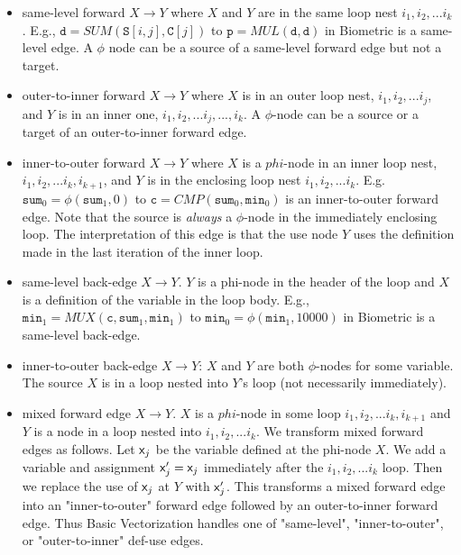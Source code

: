 \documentclass[sigconf, screen, natbib=false, dvipsnames, table]{acmart}
\theoremstyle{definition}
\begin{document}
\begin{itemize}
\item same-level forward $X\rightarrow Y$ where $X$ and $Y$ are in the same loop nest $i_1,i_2,...i_k$. E.g., $\texttt{d} = \mathit{SUM}(\texttt{S}[i,j], \texttt{C}[j])$ to $\texttt{p} = \mathit{MUL}(\texttt{d},\texttt{d})$ in Biometric is a same-level edge. A $\phi$ node can be a source of a same-level forward edge but not a target.
\item outer-to-inner forward $X\rightarrow Y$ where $X$ is in an outer loop nest, $i_1,i_2,...i_j$, and $Y$ is in an inner one, $i_1,i_2,...i_j,...,i_k$. A $\phi$-node can be a source or a target of an outer-to-inner forward edge.
\item inner-to-outer forward $X\rightarrow Y$ where $X$ is a $phi$-node in an inner loop nest, $i_1,i_2,...i_k,i_{k+1}$, and $Y$ is in the enclosing loop nest $i_1,i_2,...i_k$. E.g. $\texttt{sum}_0 = \phi(\texttt{sum}_1, 0)$ to $\texttt{c} = \mathit{CMP}(\texttt{sum}_0,\texttt{min}_0)$ is an inner-to-outer forward edge. Note that the source is \emph{always} a $\phi$-node in the immediately enclosing loop. The interpretation of this edge is that the use node $Y$ uses the definition made in the last iteration of the inner loop.
\item same-level back-edge $X\rightarrow Y$. $Y$ is a phi-node in the header of the loop and $X$ is a definition of the variable in the loop body. E.g., $\texttt{min}_1 = \mathit{MUX}(\texttt{c},\texttt{sum}_1,\texttt{min}_1)$ to $\texttt{min}_0 = \phi(\texttt{min}_1, 10000)$ in Biometric is a same-level back-edge.
\item inner-to-outer back-edge $X\rightarrow Y$: $X$ and $Y$ are both $\phi$-nodes for some variable. The source $X$ is in a loop nested into $Y$'s loop (not necessarily immediately).

\item mixed forward edge $X\rightarrow Y$. $X$ is a $phi$-node in some loop $i_1,i_2,...i_k,i_{k+1}$ and $Y$ is a node in a loop nested into $i_1,i_2,...i_k$. We transform mixed forward edges as follows. Let ${\sf {x}}_j$ be the variable defined at the phi-node $X$. We add a variable and assignment ${\sf {x}}'_j = {\sf {x}}_j$ immediately after the $i_1,i_2,...i_k$ loop. Then we replace the use of ${\sf {x}}_j$ at $Y$ with ${\sf {x}}'_j$. This transforms a mixed forward edge into an "inner-to-outer" forward edge followed by an outer-to-inner forward edge. Thus Basic Vectorization handles one of "same-level", "inner-to-outer", or "outer-to-inner" def-use edges.
 \end{itemize}
\end{document}
